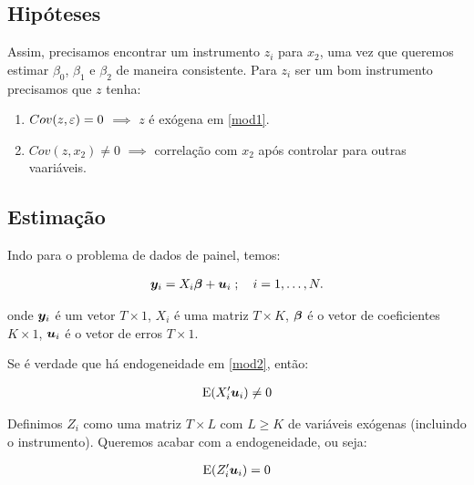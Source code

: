 \documentclass[11pt, oneside, a4paper, article]{article}
\numberwithin{equation}{section}
\begin{document}
\subsection*{Hipóteses}

Assim, precisamos encontrar um instrumento $z_{i}$ para $x_{2}$, uma vez que queremos estimar $\beta_{0}$, $\beta_{1}$ e $\beta_{2}$ de maneira consistente.
Para $z_{i}$ ser um bom instrumento precisamos que $z$ tenha:

\begin{enumerate}\itemsep0pt
\item $Cov(z, \varepsilon) = 0$ $\implies$  $z$ é exógena em \eqref{mod1}.
\item $Cov(z, x_{2}) \neq 0$ $\implies$  correlação com $x_{2}$ após controlar para outras vaariáveis.
\end{enumerate}

\subsection*{Estimação}

Indo para o problema de dados de painel, temos:

\vspace{-1 em}
\begin{align} \label{mod2}
	\boldsymbol{y}_{i} = X_{i} \boldsymbol{\beta} + \boldsymbol{u}_{i}
	\; ; \quad i = 1, \dots, N.
\end{align}

\noindent
onde 
$\boldsymbol{y}_{i}$ é um vetor $T \times 1$,
$X_{i}$ é uma matriz $T \times K$,
$\boldsymbol{\beta}$ é o vetor de coeficientes $K \times 1$,
$\boldsymbol{u}_{i}$ é o vetor de erros $T \times 1$.

Se é verdade que há endogeneidade em \eqref{mod2}, então:

\vspace{-1 em}
\begin{align*}
	\text{E}(X_{i}^{\prime} \boldsymbol{u}_{i}) \neq 0
\end{align*}

Definimos $Z_{i}$ como uma matriz $T \times L$ com $L \geq K$ de variáveis exógenas (incluindo o instrumento).
Queremos acabar com a endogeneidade, ou seja:

\vspace{-1 em}
\begin{align*}
	\text{E}(Z_{i}^{\prime} \boldsymbol{u}_{i}) = 0
\end{align*}
\end{document}
